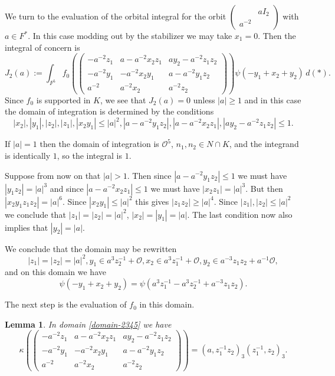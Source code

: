 \documentclass[12pt]{amsart}
\newcommand{\abs}[1]{\left|{#1}\right|}
\renewcommand{\O}{\mathcal{O}}
\newtheorem{lemma}[theorem]{Lemma}
\theoremstyle{remark}
\begin{document}
We turn to the evaluation of the orbital integral for the orbit $\left(\begin{smallmatrix}  & aI_2  \\ a^{-2}   & \end{smallmatrix}\right)$ with $a\in F^*.$  In this case modding out by the stabilizer we may take $x_1=0$.
Then the integral of concern is
$$J_2(a):=\int_{F^5}f_0\left(\begin{pmatrix} -a^{-2}z_1&a-a^{-2}x_2z_1&ay_2-a^{-2}z_1z_2\\-a^{-2}y_1&-a^{-2}x_2y_1&a-a^{-2}y_1z_2\\a^{-2}&a^{-2}x_2&a^{-2}z_2\end{pmatrix}\right)
\psi(-y_1+x_2+y_2)\,d(*).$$
Since $f_0$ is supported in $K$, we see that $J_2(a)=0$ unless $|a|\geq1$ and in this case the domain of integration is determined by the conditions 
$$\abs{x_2},\abs{y_1},\abs{z_2},\abs{z_1},\abs{x_2y_1}\leq\abs{a}^2,\abs{a-a^{-2}y_1z_2},\abs{a-a^{-2}x_2z_1},\abs{ay_2-a^{-2}z_1z_2}\leq1.$$

If $\abs{a}=1$ then the domain of integration is $\O^5$, $n_1,n_2\in N\cap K$, and the integrand is identically $1$, so the integral is $1$.

Suppose from now on that $\abs{a}>1$. Then since $\abs{a-a^{-2}y_1z_2}\leq1$ we must have $\abs{y_1z_2}=\abs{a}^3$ and since $\abs{a-a^{-2}x_2z_1}\leq1$
we must have $\abs{x_2z_1}=\abs{a}^3$. But then $\abs{x_2y_1z_1z_2}=\abs{a}^6$. Since $\abs{x_2y_1}\leq\abs{a}^2$ this gives $\abs{z_1z_2}\geq\abs{a}^4$. Since
$\abs{z_1},\abs{z_2}\leq\abs{a}^2$ we conclude that $\abs{z_1}=\abs{z_2}=\abs{a}^2$, $\abs{x_2}=\abs{y_1}=\abs{a}$.  
The last condition now also implies that $\abs{y_2}=\abs{a}$.

We conclude that the domain may be rewritten
\begin{equation}\label{domain-2345}
\abs{z_1}=\abs{z_2}=\abs{a}^2, y_1\in a^3z_2^{-1}+\O, x_2\in a^3z_1^{-1}+\O, y_2\in a^{-3}z_1z_2+a^{-1}\O,
\end{equation}
and on this domain we have
\begin{equation}\label{character-2345}
\psi(-y_1+x_2+y_2)=\psi(a^3z_1^{-1}-a^3z_2^{-1}+a^{-3}z_1z_2).
\end{equation}

The next step is the evaluation of $f_0$ in this domain.  
\begin{lemma}\label{second-kappa}  In domain \eqref{domain-2345} we have
$$\kappa\left(\begin{pmatrix} -a^{-2}z_1&a-a^{-2}x_2z_1&ay_2-a^{-2}z_1z_2\\-a^{-2}y_1&-a^{-2}x_2y_1&a-a^{-2}y_1z_2\\a^{-2}&a^{-2}x_2&a^{-2}z_2\end{pmatrix}\right)=
(a,z_1^{-1}z_2)_3(z_1^{-1},z_2)_3.$$
\end{lemma}
\end{document}
